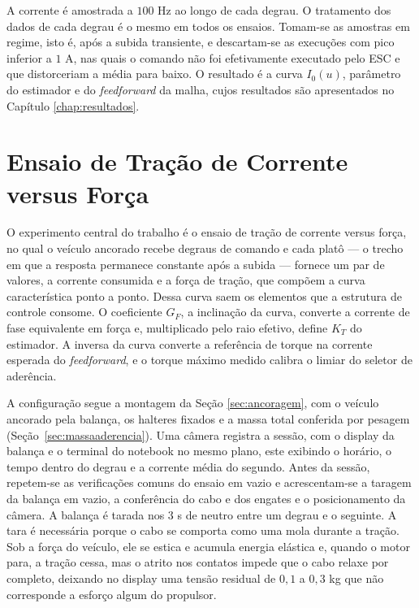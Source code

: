 A corrente é amostrada a $100$ Hz ao longo de cada degrau. O tratamento dos dados de cada
degrau é o mesmo em todos os ensaios. Tomam-se as amostras em regime, isto é, após a subida
transiente, e descartam-se as execuções com pico inferior a $1$ A, nas quais o comando não
foi efetivamente executado pelo ESC e que distorceriam a média para baixo. O resultado é a
curva $I_0(u)$, parâmetro do estimador e do \emph{feedforward} da malha, cujos resultados
são apresentados no Capítulo \ref{chap:resultados}.

\section{Ensaio de Tração de Corrente versus Força}
\label{sec:tracao}

O experimento central do trabalho é o ensaio de tração de corrente versus força, no qual o
veículo ancorado recebe degraus de comando e cada platô --- o trecho em que a resposta
permanece constante após a subida --- fornece um par de valores, a corrente consumida e a
força de tração, que compõem a curva característica ponto a ponto. Dessa curva saem os
elementos que a estrutura de controle consome. O coeficiente $G_F$, a inclinação da curva,
converte a corrente de fase equivalente em força e, multiplicado pelo raio efetivo, define
$K_T$ do estimador. A inversa da curva converte a referência de torque na corrente esperada
do \emph{feedforward}, e o torque máximo medido calibra o limiar do seletor de aderência.

A configuração segue a montagem da Seção \ref{sec:ancoragem}, com o veículo ancorado pela
balança, os halteres fixados e a massa total conferida por pesagem (Seção~\ref{sec:massaaderencia}). Uma
câmera registra a sessão, com o display da balança e o terminal do notebook no mesmo
plano, este exibindo o horário, o tempo dentro do degrau e a corrente média do segundo.
Antes da sessão, repetem-se as verificações comuns do ensaio em vazio e acrescentam-se a
taragem da balança em vazio, a conferência do cabo e dos engates e o posicionamento da
câmera. A balança é tarada nos $3$ s de neutro entre um degrau e o seguinte. A tara é
necessária porque o cabo se comporta como uma mola durante a tração. Sob a força do
veículo, ele se estica e acumula energia elástica e, quando o motor para, a tração cessa,
mas o atrito nos contatos impede que o cabo relaxe por completo, deixando no display uma
tensão residual de $0{,}1$ a $0{,}3$ kg que não corresponde a esforço algum do propulsor.

